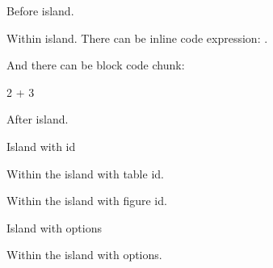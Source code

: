 \documentclass{article}
\begin{document}
Before island.

\begin{island}

Within island. There can be inline code expression: .

And there can be block code chunk:

\begin{chunk}
2 + 3
\end{chunk}

\end{island}

After island.

Island with id

\begin{island}

Within the island with table id.

\end{island}

\begin{island}

Within the island with figure id.

\end{island}

Island with options

\begin{island}[label-type=table, label=7, style=some-style]

Within the island with options.

\end{island}
\end{document}
